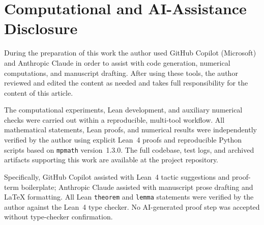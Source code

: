 \documentclass[11pt,a4paper]{article}
\theoremstyle{definition}
\begin{document}
\section*{Computational and AI-Assistance Disclosure}

During the preparation of this work the author used GitHub Copilot
(Microsoft) and Anthropic Claude in order to assist with code
generation, numerical computations, and manuscript drafting.  After
using these tools, the author reviewed and edited the content as
needed and takes full responsibility for the content of this
article.

The computational experiments, Lean development, and auxiliary
numerical checks were carried out within a reproducible, multi-tool
workflow.  All mathematical statements, Lean proofs, and numerical
results were independently verified by the author using explicit
Lean~4 proofs and reproducible Python scripts based on
\texttt{mpmath} version~1.3.0.  The full codebase, test logs, and
archived artifacts supporting this work are available at the project
repository.

Specifically, GitHub Copilot assisted with Lean~4 tactic
suggestions and proof-term boilerplate; Anthropic Claude assisted
with manuscript prose drafting and \LaTeX{} formatting.  All Lean
\texttt{theorem} and \texttt{lemma} statements were verified by
the author against the Lean~4 type checker.  No AI-generated proof
step was accepted without type-checker confirmation.
\end{document}
